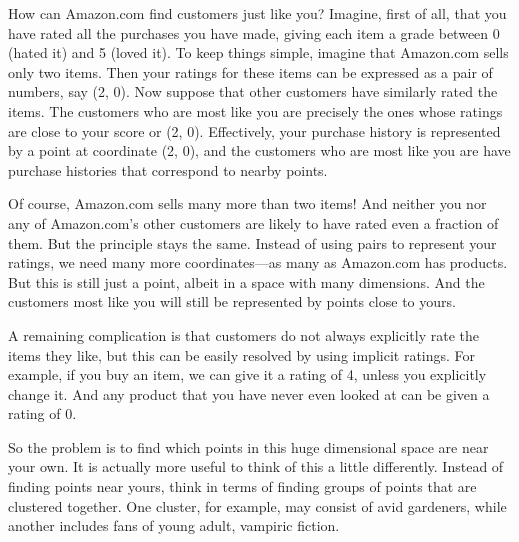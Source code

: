 How can Amazon.com find customers just like you?  Imagine, first of all, that
you have rated all the purchases you have made, giving each item a grade between
0 (hated it) and 5 (loved it).  To keep things simple, imagine that Amazon.com
sells only two items.  Then your ratings for these items can be expressed as
a pair of numbers, say (2, 0).  Now suppose that other customers have similarly
rated the items.  The customers who are most like you are precisely the ones
whose ratings are close to your score or (2, 0).  Effectively, your purchase
history is represented by a point at coordinate (2, 0), and the customers who
are most like you are have purchase histories that correspond to nearby points.

Of course, Amazon.com sells many more than two items!  And neither you nor any
of Amazon.com's other customers are likely to have rated even a fraction of them.
But the principle stays the same.  Instead of using pairs to represent your
ratings, we need many more coordinates---as many as Amazon.com has products.
But this is still just a point, albeit in a space with many dimensions.  And the
customers most like you will still be represented by points close to yours.

A remaining complication is that customers do not always explicitly rate the
items they like, but this can be easily resolved by using implicit ratings.
For example, if you buy an item, we can give it a rating of 4, unless you
explicitly change it.  And any product that you have never even looked at
can be given a rating of 0.

So the problem is to find which points in this huge dimensional space are near
your own.  It is actually more useful to think of this a little differently.
Instead of finding points near yours, think in terms of finding groups of
points that are clustered together.  One cluster, for example, may consist of
avid gardeners, while another includes fans of young adult, vampiric fiction.


